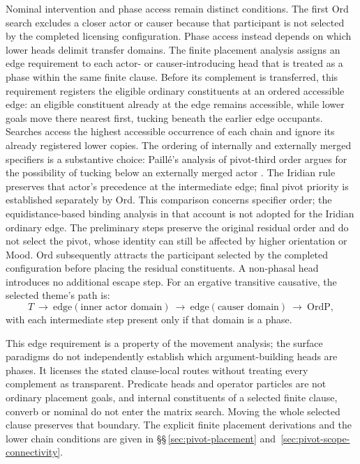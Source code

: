 Nominal intervention and phase access remain distinct conditions. The first
 Ord search excludes a closer actor or causer because that participant is not
 selected by the completed licensing configuration. Phase access instead
 depends on which lower heads delimit transfer domains. The finite placement
 analysis assigns an edge requirement to each actor- or causer-introducing
 head that is treated as a phase within the same finite clause. Before its
 complement is transferred, this requirement registers the eligible ordinary
 constituents at an ordered accessible edge: an eligible constituent already
 at the edge remains accessible, while lower goals move there nearest first,
 tucking beneath the earlier edge occupants. Searches access the highest
 accessible occurrence of each chain and ignore its already registered lower
 copies. The ordering of internally and externally merged specifiers is a
 substantive choice: Paillé's analysis of pivot-third order argues for the
 possibility of tucking below an externally merged actor
 \cite[§5.1]{paille2021}. The Iridian rule preserves that actor's
 precedence at the intermediate edge; final pivot priority is established
 separately by Ord. This comparison concerns specifier order; the
 equidistance-based binding analysis in that account is not adopted for the
 Iridian ordinary edge. The preliminary steps preserve the original residual
 order and do not select the pivot, whose identity can
 still be affected by higher orientation or Mood. Ord subsequently attracts
 the participant selected by the completed configuration before placing the
 residual constituents. A non-phasal head introduces no additional escape
 step. For an ergative transitive causative, the selected theme's path is:
\[
 T\ \longrightarrow\ \mathrm{edge}(\text{inner actor domain})
 \ \longrightarrow\ \mathrm{edge}(\text{causer domain})
 \ \longrightarrow\ \mathrm{OrdP},
\]
with each intermediate step present only if that domain is a phase.

This edge requirement is a property of the movement analysis; the surface
 paradigms do not independently establish which argument-building heads are
 phases. It licenses the stated clause-local routes without treating every
 complement as transparent. Predicate heads and operator particles are not
 ordinary placement goals, and internal constituents of a selected finite
 clause, converb or nominal do not enter the matrix search. Moving the whole
 selected clause preserves that boundary. The explicit finite placement
 derivations and the lower chain conditions are given in
 §§\,\ref{sec:pivot-placement} and~\ref{sec:pivot-scope-connectivity}.

